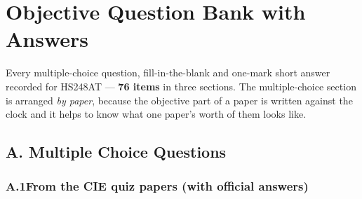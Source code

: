 \chapter{Objective Question Bank with Answers}

Every multiple-choice question, fill-in-the-blank and one-mark short answer
recorded for HS248AT --- \textbf{76 items} in three sections. The
multiple-choice section is arranged \emph{by paper}, because the objective
part of a paper is written against the clock and it helps to know what one
paper's worth of them looks like.

\section{A. Multiple Choice Questions}

\subsection*{A.1\enspace From the CIE quiz papers (with official answers)}

